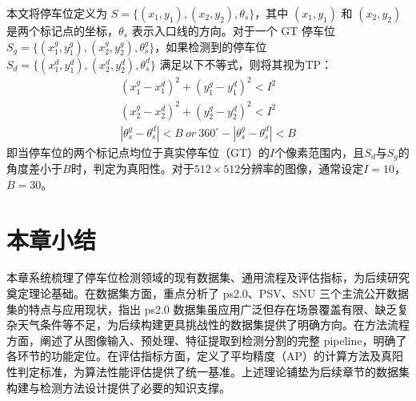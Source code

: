 本文将停车位定义为 $S=\{(x_{1}, y_{1}), (x_{2}, y_{2}), \theta_{s}\}$，其中 $(x_{1}, y_{1})$ 和 $(x_{2}, y_{2})$ 是两个标记点的坐标，$\theta_{s}$ 表示入口线的方向。对于一个 GT 停车位 $S_{g}=\{(x_{1}^{g}, y_{1}^{g}), (x_{2}^{g}, y_{2}^{g}), \theta_{s}^{g}\}$，如果检测到的停车位 $S_{d}=\{(x_{1}^{d}, y_{1}^{d}), (x_{2}^{d}, y_{2}^{d}), \theta_{s}^{d}\}$ 满足以下不等式，则将其视为TP：
\begin{subequations}
  \begin{align}
  (x_{1}^{g}-x_{1}^{d})^{2} + (y_{1}^{g}-y_{1}^{d})^{2} < I^{2} \\
(x_{2}^{g}-x_{2}^{d})^{2} + (y_{2}^{g}-y_{2}^{d})^{2} < I^{2} \\
|\theta_{s}^{g} - \theta_{s}^{d}| < B \ or \ 360^{\circ} - |\theta_{s}^{g} - \theta_{s}^{d}| < B
  \end{align}
  \end{subequations}
即当停车位的两个标记点均位于真实停车位（GT）的$I$个像素范围内，且$S_{d}$与$S_{g}$的角度差小于$B$时，判定为真阳性。对于$512 \times 512$分辨率的图像，通常设定$I=10$，$B=30$。


\section{本章小结}

本章系统梳理了停车位检测领域的现有数据集、通用流程及评估指标，为后续研究奠定理论基础。在数据集方面，重点分析了 ps2.0、PSV、SNU 三个主流公开数据集的特点与应用现状，指出 ps2.0 数据集虽应用广泛但存在场景覆盖有限、缺乏复杂天气条件等不足，为后续构建更具挑战性的数据集提供了明确方向。在方法流程方面，阐述了从图像输入、预处理、特征提取到检测分割的完整 pipeline，明确了各环节的功能定位。在评估指标方面，定义了平均精度（AP）的计算方法及真阳性判定标准，为算法性能评估提供了统一基准。上述理论铺垫为后续章节的数据集构建与检测方法设计提供了必要的知识支撑。